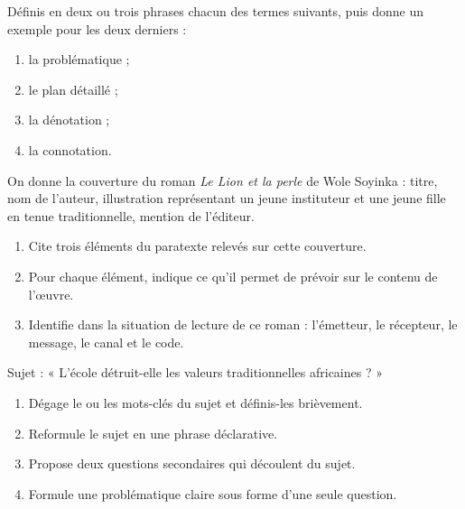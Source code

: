 \documentclass[11pt]{article}
\newcounter{popsec}
\newcounter{popsub}
\newcommand{\courssub}[1]{%
  \stepcounter{popsub}%
  \par\vspace{9pt}\noindent{\popxbold\fontsize{11.5}{13}\selectfont\color{popink}{\color{poporange}\thepopsec.\thepopsub}\hspace{6pt}#1}\par\nopagebreak\vspace{4pt}
}
\begin{document}
\begin{exercice}[Définitions]
Définis en deux ou trois phrases chacun des termes suivants, puis donne un exemple pour les deux derniers :
\begin{enumerate}
\item la problématique ;
\item le plan détaillé ;
\item la dénotation ;
\item la connotation.
\end{enumerate}
\end{exercice}

\begin{exercice}
On donne la couverture du roman \emph{Le Lion et la perle} de Wole Soyinka : titre, nom de l'auteur, illustration représentant un jeune instituteur et une jeune fille en tenue traditionnelle, mention de l'éditeur.
\begin{enumerate}
\item Cite trois éléments du paratexte relevés sur cette couverture.
\item Pour chaque élément, indique ce qu'il permet de prévoir sur le contenu de l'œuvre.
\item Identifie dans la situation de lecture de ce roman : l'émetteur, le récepteur, le message, le canal et le code.
\end{enumerate}
\end{exercice}

\courssub{Je m'entraîne}

\begin{exercice}
Sujet : « L'école détruit-elle les valeurs traditionnelles africaines ? »
\begin{enumerate}
\item Dégage le ou les mots-clés du sujet et définis-les brièvement.
\item Reformule le sujet en une phrase déclarative.
\item Propose deux questions secondaires qui découlent du sujet.
\item Formule une problématique claire sous forme d'une seule question.
\end{enumerate}
\end{exercice}
\end{document}
